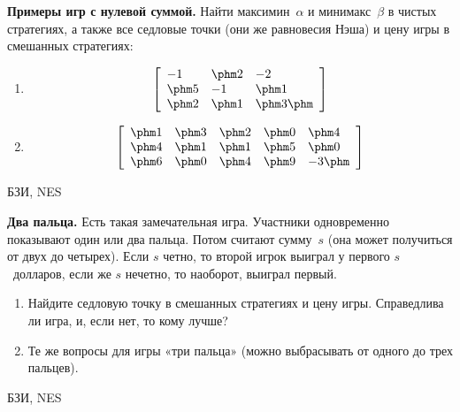 \begin{problem}
 {\bf Примеры игр с нулевой суммой.} Найти
максимин~$\alpha$ и минимакс~$\beta$ в чистых стратегиях, а
также все седловые точки (они же равновесия Нэша) и цену
игры в смешанных стратегиях:

\begin{enumerate}

\item \[\left[\begin{array}{lll} -1&\phm 2&-2\\ \phm 5&-1&\phm 1\\
\phm 2&\phm 1&\phm 3\phm \\
\end{array}\right]\]

\bigskip

\item \[\left[\begin{array}{lllll} \phm 1&\phm 3&\phm 2&\phm 0&\phm 4\\
\phm 4&\phm 1&\phm 1&\phm 5&\phm 0\\ \phm 6&\phm 0&\phm
4&\phm
9&-3\phm \\
\end{array}\right]\]

\end{enumerate}




\begin{source}
БЗИ, NES
\end{source}


\begin{sol}

\end{sol}
\end{problem}




\begin{problem}
 {\bf Два пальца.} Есть такая замечательная игра.
Участники одновременно показывают один или два пальца.
Потом считают сумму~$s$ (она может получиться от двух до
четырех). Если $s$ четно, то второй игрок выиграл у первого
$s$~долларов, если же $s$ нечетно, то наоборот, выиграл
первый.

\begin{enumerate}

\item Найдите седловую точку в смешанных стратегиях и цену
игры. Справедлива ли игра, и, если нет, то кому лучше?

\item Те же вопросы для игры «три пальца» (можно
выбрасывать от одного до трех пальцев).

\end{enumerate}




\begin{source}
БЗИ, NES
\end{source}


\begin{sol}

\end{sol}
\end{problem}





